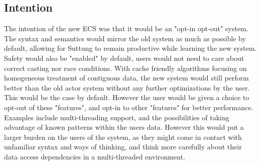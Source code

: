 \subsection{Intention}
The intention of the new ECS was that it would be an "opt-in opt-out" system.
The syntax and semantics would mirror the old system as much as possible by default,
allowing for Suttung to remain productive while learning the new system.
Safety would also be "enabled" by default, users would not need to care about correct casting
nor race conditions.
With cache friendly algorithms focusing on homogeneous treatment of contiguous data,
the new system would still perform better than the old actor system without any further optimizations by the user.
This would be the case by default. However the user would be given a choice to opt-out of these "features",
and opt-in to other "features" for better performance.
Examples include multi-threading support, and the possibilities of taking advantage of known patterns within the users data.
However this would put a larger burden on the users of the system, as they might come in contact with unfamiliar syntax and ways of thinking,
and think more carefully about their data access dependencies in a multi-threaded environment.

